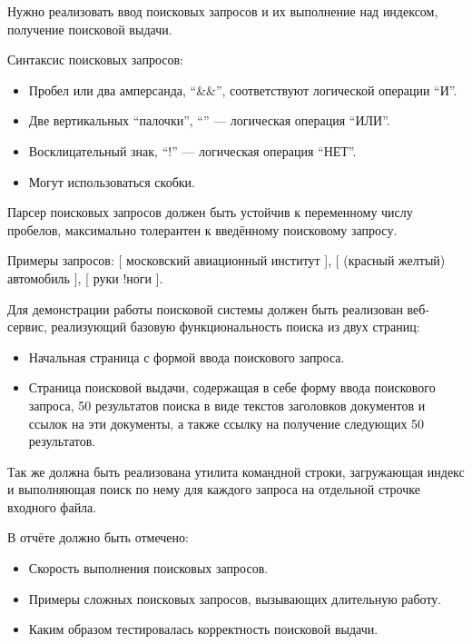 \pagebreak
{}

Нужно реализовать ввод поисковых запросов и их выполнение над индексом, получение поисковой выдачи.

Синтаксис поисковых запросов:
\begin{itemize}
    \item Пробел или два амперсанда, \enquote{\&\&}, соответствуют логической операции \enquote{И}.
    \item Две вертикальных \enquote{палочки}, \enquote{\textbar\textbar} --- логическая операция \enquote{ИЛИ}.
    \item Восклицательный знак, \enquote{!} --- логическая операция \enquote{НЕТ}.
    \item Могут использоваться скобки.
\end{itemize}
Парсер поисковых запросов должен быть устойчив к переменному числу пробелов, максимально толерантен к введённому поисковому запросу.

Примеры запросов: [ московский авиационный институт ], [ (красный \textbar\textbar{} желтый) автомобиль ], [ руки !ноги ].

Для демонстрации работы поисковой системы должен быть реализован веб-сервис, реализующий базовую функциональность поиска из двух страниц:
\begin{itemize}
    \item Начальная страница с формой ввода поискового запроса.
    \item Страница поисковой выдачи, содержащая в себе форму ввода поискового запроса, 50 результатов поиска в виде текстов заголовков документов и ссылок на эти документы, а также ссылку на получение следующих 50 результатов.
\end{itemize}
Так же должна быть реализована утилита командной строки, загружающая индекс и выполняющая поиск по нему для каждого запроса на отдельной строчке входного файла.

В отчёте должно быть отмечено:
\begin{itemize}
    \item Скорость выполнения поисковых запросов.
    \item Примеры сложных поисковых запросов, вызывающих длительную работу.
    \item Каким образом тестировалась корректность поисковой выдачи.
\end{itemize}
